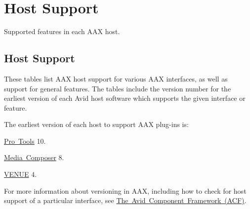 \hypertarget{a00845}{}\section{Host Support}
\label{a00845}
Supported features in each A\+AX host. 

 \hypertarget{a00845_hostsupport}{}\subsection{Host Support}\label{a00845_hostsupport}
 These tables list A\+AX host support for various A\+AX interfaces, as well as support for general features. The tables include the version number for the earliest version of each Avid host software which supports the given interface or feature.

The earliest version of each host to support A\+AX plug-\/ins is\+: \begin{DoxyItemize}
\item \mbox{\hyperlink{a00830}{Pro Tools}} 10. \item \mbox{\hyperlink{a00831}{Media Composer}} 8. \item \mbox{\hyperlink{a00849}{V\+E\+N\+UE}} 4.\end{DoxyItemize}
For more information about versioning in A\+AX, including how to check for host support of a particular interface, see \mbox{\hyperlink{a00827}{The Avid Component Framework (A\+CF)}}.


